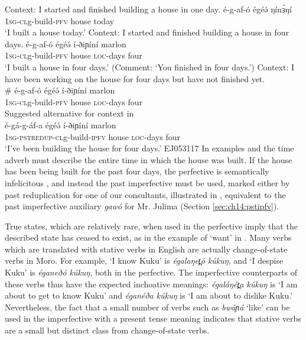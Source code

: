 \ea \ea Context: I started and finished building a house in one day.  \label{ex:ch11:perfacha}
\gll é-g-af-ó égéə́    ŋínɜ́ŋí\\
\textsc{1sg}-\textsc{cl}g-build-\textsc{pfv} house today\\
\glt `I built a house today.'
\ex Context: I started and finished building a house in four days.  \label{ex:ch11:perfachb}
\gll é-g-af-ó égéə́    í-ðiɲíní marlon\\
\textsc{1sg}-\textsc{cl}g-build-\textsc{pfv} house \textsc{loc}-days four\\
\glt `I built a house in four days.' (Comment: `You finished in four days.')
\ex Context: I have been working on the house for four days but have not finished yet. \label{ex:ch11:perfachc}\\
\gll \# é-g-af-ó égéə́    í-ðiɲíní marlon\\
{} \textsc{1sg}-\textsc{cl}g-build-\textsc{pfv} house \textsc{loc}-days four\\
\ex Suggested alternative for context in   \label{ex:ch11:perfachc}\\
\gll é-gá-g-áf-a égéə́    í-ðiɲíní marlon\\
\textsc{1sg}-\textsc{pstredup}-\textsc{cl}g-build-\textsc{ipfv} house \textsc{loc}-days four\\
\glt `I've been building the house for four days.'  \hfill EJ053117
\z 
\z
In examples  and  the time adverb must describe the entire time in which the house was built. If the house has been being built for the past four days, the perfective is semantically infelicitous , and instead the past imperfective must be used, marked either by past reduplication for one of our consultants, illustrated in , equivalent to the past imperfective auxiliary \textit{gawó} for Mr. Julima (Section \ref{sec:ch14:pstipfv}). 

True states, which are relatively rare, when used in the perfective imply that the described state has ceased to exist, as in the example of `want' in . Many verbs which are translated with stative verbs in English are actually change-of-state verbs in Moro. For example, `I know Kuku' is \textit{égalaŋet̪ó kúkuŋ}, and `I despise Kuku' is \textit{éganeðó kúkuŋ}, both in the perfective. The imperfective counterparts of these verbs thus have the expected inchoative meanings:  \textit{égaláŋét̪a kúkuŋ} is `I am about to get to know Kuku' and \textit{éganéða kúkuŋ} is `I am about to dislike Kuku.' Nevertheless, the fact that a small number of verbs such as \textit{bwáɲá} `like' can be used in the imperfective with a present tense meaning indicates that stative verbs are a small but distinct class from change-of-state verbs.

